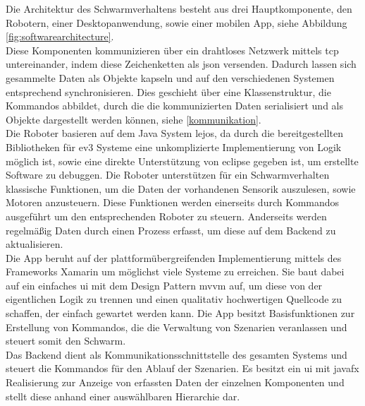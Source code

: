 Die Architektur des Schwarmverhaltens besteht aus drei Hauptkomponente, den Robotern, einer Desktopanwendung, sowie einer mobilen App, siehe Abbildung \ref{fig:softwarearchitecture}.\\
Diese Komponenten kommunizieren über ein drahtloses Netzwerk mittels \gls{tcp} untereinander, indem diese Zeichenketten als \gls{json} versenden. Dadurch lassen sich gesammelte Daten als Objekte kapseln und auf den verschiedenen Systemen entsprechend synchronisieren. Dies geschieht über eine Klassenstruktur, die Kommandos abbildet, durch die die kommunizierten Daten serialisiert und als Objekte dargestellt werden können, siehe \ref{kommunikation}.\\
Die Roboter basieren auf dem Java System \gls{lejos}, da durch die bereitgestellten Bibliotheken für \gls{ev3} Systeme eine unkomplizierte Implementierung von Logik möglich ist, sowie eine direkte Unterstützung von \gls{eclipse} gegeben ist, um erstellte Software zu debuggen. Die Roboter unterstützen für ein Schwarmverhalten klassische Funktionen, um die Daten der vorhandenen Sensorik auszulesen, sowie Motoren anzusteuern. Diese Funktionen werden einerseits durch Kommandos ausgeführt um den entsprechenden Roboter zu steuern. Anderseits werden regelmäßig Daten durch einen Prozess erfasst, um diese auf dem Backend zu aktualisieren.\\
Die App beruht auf der plattformübergreifenden Implementierung mittels des Frameworks Xamarin um möglichst viele Systeme zu erreichen. Sie baut dabei auf ein einfaches \gls{ui} mit dem Design Pattern \gls{mvvm} auf, um diese von der eigentlichen Logik zu trennen und einen qualitativ hochwertigen Quellcode zu schaffen, der einfach gewartet werden kann. Die App besitzt Basisfunktionen zur Erstellung von Kommandos, die die Verwaltung von Szenarien veranlassen und steuert somit den Schwarm.\\
Das Backend dient als Kommunikationsschnittstelle des gesamten Systems und steuert die Kommandos für den Ablauf der Szenarien. Es besitzt ein \gls{ui} mit \gls{javafx} Realisierung zur Anzeige von erfassten Daten der einzelnen Komponenten und stellt diese anhand einer auswählbaren Hierarchie dar.

